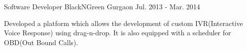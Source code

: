 \begin{cventries}
  \cventry
    {Software Developer} %
    {BlackNGreen} %
    {Gurgaon} %
    {Jul. 2013 - Mar. 2014} %
    {
     \vspace{3pt}
      \begin{cvitems} %
        \item {Developed a platform which allows the development of custom IVR(Interactive Voice Response) using drag-n-drop. It is also equipped with a scheduler for OBD(Out Bound Calls).}
      \end{cvitems}
    }
\end{cventries}

